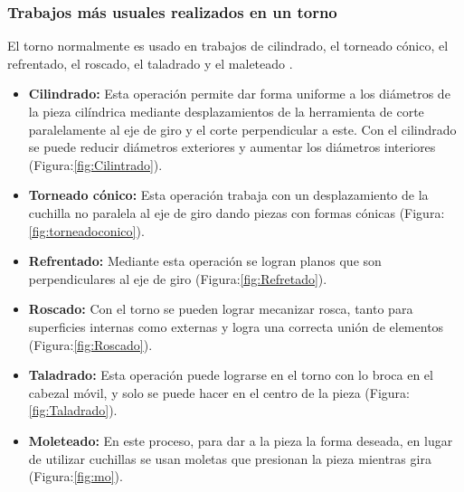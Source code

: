 \subsubsection*{Trabajos más usuales realizados en un torno}
El torno normalmente es usado en trabajos de cilindrado, el torneado cónico, el refrentado, el roscado, el taladrado y el maleteado \citep{Fenoll2009}.\\
\begin{itemize}
    \item\textbf{ Cilindrado:} Esta operación permite dar forma uniforme a los diámetros de la pieza cilíndrica mediante desplazamientos de la herramienta de corte paralelamente al eje de giro y el corte perpendicular a este. Con el cilindrado se puede reducir diámetros exteriores y aumentar los diámetros interiores \citep{Fenoll2009} (Figura:\ref{fig:Cilintrado}).
    \item\textbf{Torneado cónico:} Esta operación trabaja con un desplazamiento de la cuchilla no paralela al eje de giro dando piezas con formas cónicas \citep{Fenoll2009}(Figura:\ref{fig:torneadoconico}).
    \item\textbf{Refrentado:} Mediante esta operación se logran planos que son perpendiculares al eje de giro \citep{Fenoll2009}(Figura:\ref{fig:Refretado}).
    \item\textbf{Roscado:} Con el torno se pueden lograr mecanizar rosca, tanto para superficies internas como externas y logra una correcta unión de elementos \citep{Fenoll2009}(Figura:\ref{fig:Roscado}).
    \item\textbf{Taladrado:} Esta operación puede lograrse en el torno con lo broca en el cabezal móvil, y solo se puede hacer en el centro de la pieza \citep{Fenoll2009}(Figura:\ref{fig:Taladrado}).
    \item\textbf{Moleteado:} En este proceso, para dar a la pieza la forma deseada, en lugar de utilizar cuchillas se usan moletas que presionan la pieza mientras gira \citep{Fenoll2009}(Figura:\ref{fig:mo}).
\end{itemize}

